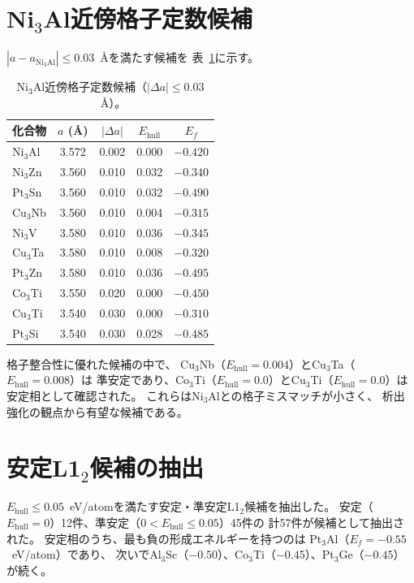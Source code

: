 \documentclass[5p,twocolumn]{elsarticle}
\begin{document}
\section{Ni$_3$Al近傍格子定数候補}
\label{sec:sup_lattice_match}

$|a - a_{\text{Ni}_3\text{Al}}| \leq 0.03$~\AA を満たす候補を
表~\ref{tab:lattice_match}に示す。

\begin{table}[htbp]
  \centering
  \caption{Ni$_3$Al近傍格子定数候補（$|\Delta a| \leq 0.03$~\AA）。}
  \label{tab:lattice_match}
  \small
  \begin{tabular}{lcccc}
    \toprule
    化合物 & $a$ (\AA) & $|\Delta a|$ & $E_\text{hull}$ & $E_f$ \\
    \midrule
    Ni$_3$Al & 3.572 & 0.002 & 0.000 & $-0.420$ \\
    Ni$_3$Zn & 3.560 & 0.010 & 0.032 & $-0.340$ \\
    Pt$_3$Sn & 3.560 & 0.010 & 0.032 & $-0.490$ \\
    Cu$_3$Nb & 3.560 & 0.010 & 0.004 & $-0.315$ \\
    Ni$_3$V & 3.580 & 0.010 & 0.036 & $-0.345$ \\
    Cu$_3$Ta & 3.580 & 0.010 & 0.008 & $-0.320$ \\
    Pt$_3$Zn & 3.580 & 0.010 & 0.036 & $-0.495$ \\
    Co$_3$Ti & 3.550 & 0.020 & 0.000 & $-0.450$ \\
    Cu$_3$Ti & 3.540 & 0.030 & 0.000 & $-0.310$ \\
    Pt$_3$Si & 3.540 & 0.030 & 0.028 & $-0.485$ \\
    \bottomrule
  \end{tabular}
\end{table}

格子整合性に優れた候補の中で、
Cu$_3$Nb（$E_\text{hull} = 0.004$）とCu$_3$Ta（$E_\text{hull} = 0.008$）は
準安定であり、Co$_3$Ti（$E_\text{hull} = 0.0$）とCu$_3$Ti（$E_\text{hull} = 0.0$）は
安定相として確認された。
これらはNi$_3$Alとの格子ミスマッチが小さく、
析出強化の観点から有望な候補である。

\section{安定L1$_2$候補の抽出}
\label{sec:sup_stable_l12}

$E_\text{hull} \leq 0.05$~eV/atomを満たす安定・準安定L1$_2$候補を抽出した。
安定（$E_\text{hull} = 0$）12件、準安定（$0 < E_\text{hull} \leq 0.05$）45件の
計57件が候補として抽出された。
安定相のうち、最も負の形成エネルギーを持つのは
Pt$_3$Al（$E_f = -0.55$~eV/atom）であり、
次いでAl$_3$Sc（$-0.50$）、Co$_3$Ti（$-0.45$）、Pt$_3$Ge（$-0.45$）が続く。
\end{document}
